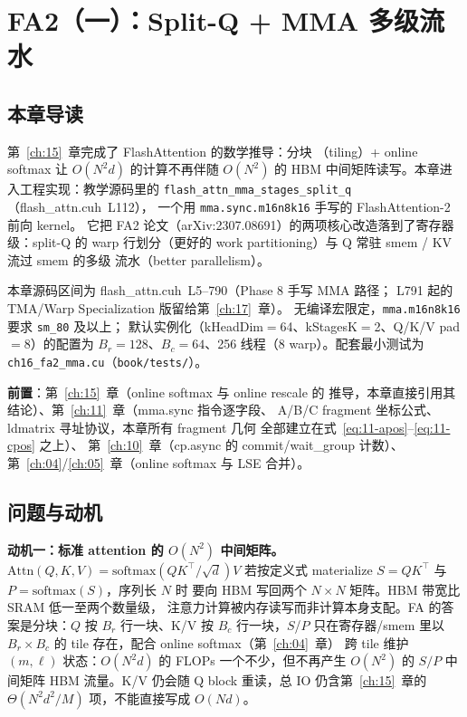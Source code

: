 \providecommand{\url}[1]{\texttt{#1}}
\chapter{FA2（一）：Split-Q + MMA 多级流水}\label{ch:16}

\section{本章导读}

第~\ref{ch:15}~章完成了 FlashAttention 的数学推导：分块
（tiling）+ online softmax 让 $O(N^2 d)$ 的计算不再伴随 $O(N^2)$ 的
HBM 中间矩阵读写。本章进入工程实现：教学源码里的
\texttt{flash\_\allowbreak{}attn\_\allowbreak{}mma\_\allowbreak{}stages\_\allowbreak{}split\_\allowbreak{}q}（flash\_attn.cuh~L112），
一个用 \texttt{mma.\allowbreak{}sync.\allowbreak{}m16n8k16} 手写的 FlashAttention-2 前向 kernel。
它把 FA2 论文（arXiv:2307.08691）的两项核心改造落到了寄存器级：split-Q 的
warp 行划分（更好的 work partitioning）与 Q 常驻 smem / KV 流过 smem 的多级
流水（better parallelism）。

本章源码区间为 flash\_attn.cuh~L5--790（Phase 8 手写 MMA 路径；
L791 起的 TMA/Warp Specialization 版留给第~\ref{ch:17}~章）。
无编译宏限定，\texttt{mma.\allowbreak{}m16n8k16} 要求 \texttt{sm\_80} 及以上；
默认实例化（kHeadDim$=$64、kStagesK$=$2、Q/K/V pad$=$8）的配置为
$B_r{=}128$、$B_c{=}64$、256 线程（8 warp）。配套最小测试为
\texttt{ch16\_\allowbreak{}fa2\_\allowbreak{}mma.\allowbreak{}cu}（\texttt{book/tests/}）。

\textbf{前置}：第~\ref{ch:15}~章（online softmax 与 online rescale 的
推导，本章直接引用其结论）、第~\ref{ch:11}~章（mma.sync 指令逐字段、
A/B/C fragment 坐标公式、ldmatrix 寻址协议，本章所有 fragment 几何
全部建立在式~\ref{eq:11-apos}--\ref{eq:11-cpos} 之上）、
第~\ref{ch:10}~章（cp.async 的 commit/wait\_group 计数）、
第~\ref{ch:04}/\ref{ch:05}~章（online softmax 与 LSE 合并）。

\section{问题与动机}

\textbf{动机一：标准 attention 的 $O(N^2)$ 中间矩阵。}
$\mathrm{Attn}(Q,K,V)=\mathrm{softmax}(QK^\top/\sqrt{d})V$ 若按定义式
materialize $S=QK^\top$ 与 $P=\mathrm{softmax}(S)$，序列长 $N$ 时
要向 HBM 写回两个 $N\times N$ 矩阵。HBM 带宽比 SRAM 低一至两个数量级，
注意力计算被内存读写而非计算本身支配。FA 的答案是分块：$Q$ 按
$B_r$ 行一块、K/V 按 $B_c$ 行一块，$S$/$P$ 只在寄存器/smem 里以
$B_r\times B_c$ 的 tile 存在，配合 online softmax（第~\ref{ch:04}~章）
跨 tile 维护 $(m,\ell)$ 状态：$O(N^2 d)$ 的 FLOPs 一个不少，但不再产生 $O(N^2)$ 的
$S/P$ 中间矩阵 HBM 流量。K/V 仍会随 Q block 重读，总 IO 仍含第~\ref{ch:15}~章的
$\Theta(N^2d^2/M)$ 项，不能直接写成 $O(Nd)$。


